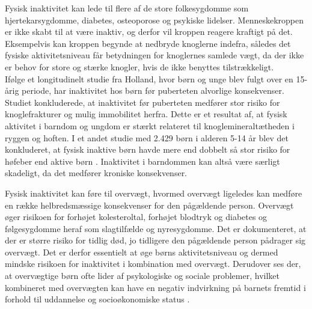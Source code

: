 Fysisk inaktivitet kan lede til flere af de store folkesygdomme som hjertekarsygdomme, diabetes, osteoporose og psykiske lidelser. Menneskekroppen er ikke skabt til at være inaktiv, og derfor vil kroppen reagere kraftigt på det. Eksempelvis kan kroppen begynde at nedbryde knoglerne indefra, således det fysiske aktivitetsniveau får betydningen for knoglernes samlede vægt, da der ikke er behov for store og stærke knogler, hvis de ikke benyttes tilstrækkeligt. \citep{Kiens2007,Reshma2002,Martini2012} \\
Ifølge et longitudinelt studie fra Holland, hvor børn og unge blev fulgt over en 15-årig periode, har inaktivitet hos børn før puberteten alvorlige konsekvenser. Studiet konkluderede, at inaktivitet før puberteten medfører stor risiko for knoglefrakturer og mulig immobilitet herfra. Dette er et resultat af, at fysisk aktivitet i barndom og ungdom er stærkt relateret til knoglemineraltætheden i ryggen og hoften. \citep{Kemper2000} I et andet studie med 2.429 børn i alderen 5-14 år blev det konkluderet, at fysisk inaktive børn havde mere end dobbelt så stor risiko for høfeber end aktive børn \citep{Kohlhammer2006}. Inaktivitet i barndommen kan altså være særligt skadeligt, da det medfører kroniske konsekvenser.

Fysisk inaktivitet kan føre til overvægt, hvormed overvægt ligeledes kan medføre en række helbredsmæssige konsekvenser for den pågældende person. Overvægt øger risikoen for forhøjet kolesteroltal, forhøjet blodtryk og diabetes og følgesygdomme heraf som slagtilfælde og nyresygdomme. Det er dokumenteret, at der er større risiko for tidlig død, jo tidligere den pågældende person pådrager sig overvægt. Det er derfor essentielt at øge børns aktivitetsniveau og dermed mindske risikoen for inaktivitet i kombination med overvægt. \citep{Nestle2014} Derudover ses der, at overvægtige børn ofte lider af psykologiske og sociale problemer, hvilket kombineret med overvægten kan have en negativ indvirkning på barnets fremtid i forhold til uddannelse og socioøkonomiske status \citep{Academic2016}.


